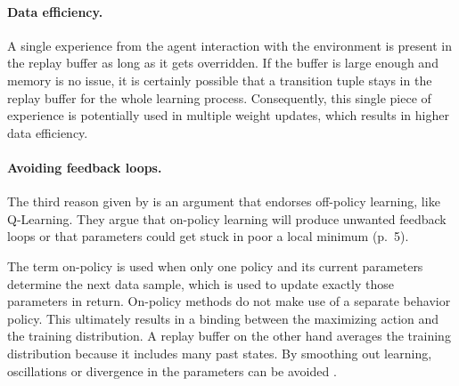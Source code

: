 \paragraph{Data efficiency.} A single experience from the agent interaction with the environment is present in the replay buffer as long as it gets overridden. If the buffer is large enough and memory is no issue, it is certainly possible that a transition tuple stays in the replay buffer for the whole learning process. Consequently, this single piece of experience is potentially used in multiple weight updates, which results in higher data efficiency.

\paragraph{Avoiding feedback loops.} The third reason given by \cite{mnih2013playing} is an argument that endorses off-policy learning, like Q-Learning. They argue that on-policy learning will produce unwanted feedback loops or that parameters could get stuck in poor a local minimum (p.~5). 
\par 
The term on-policy is used when only one policy and its current parameters determine the next data sample, which is used to update exactly those parameters in return. On-policy methods do not make use of a separate behavior policy. This ultimately results in a  binding between the maximizing action and the training distribution. A replay buffer on the other hand averages the training distribution because it includes many past states. By smoothing out learning,
oscillations or divergence in the parameters can be avoided \cite[p.~5]{mnih2013playing}.